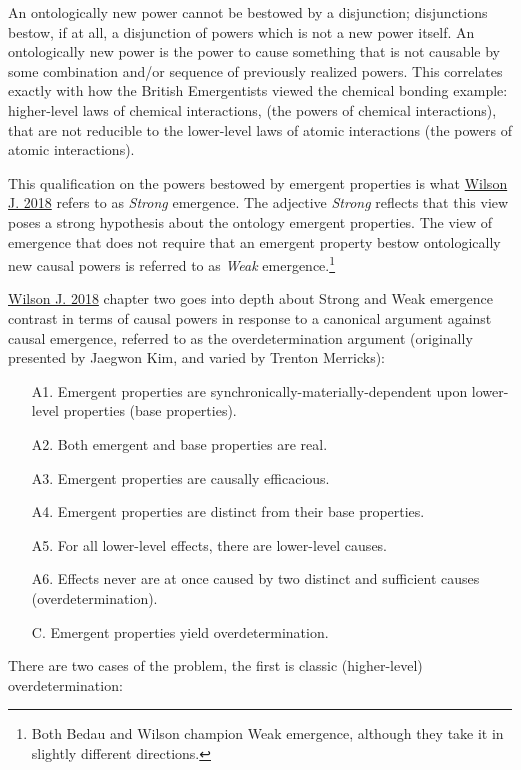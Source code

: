 \documentclass{article}
\newcommand{\ti}[1]{\textit{#1}}
\renewcommand{\cite}[1]{\hyperlink{#1}{#1}}
\begin{document}
An ontologically new power cannot be bestowed by a disjunction; disjunctions bestow, if at all, a disjunction of powers which is not a new power itself. An ontologically new power is the power to cause something that is not causable by some combination and/or sequence of previously realized powers. This correlates exactly with how the British Emergentists viewed the chemical bonding example: higher-level laws of chemical interactions, (the powers of chemical interactions), that are not reducible to the lower-level laws of atomic interactions (the powers of atomic interactions).

This qualification on the powers bestowed by emergent properties is what \cite{Wilson J. 2018} refers to as \ti{Strong} emergence. The adjective \ti{Strong} reflects that this view poses a strong hypothesis about the ontology emergent properties. The view of emergence that does not require that an emergent property bestow ontologically new causal powers is referred to as \ti{Weak} emergence.\footnote{Both Bedau and Wilson champion Weak emergence, although they take it in slightly different directions.}

\cite{Wilson J. 2018} chapter two goes into depth about Strong and Weak emergence contrast in terms of causal powers in response to a canonical argument against causal emergence, referred to as the overdetermination argument (originally presented by Jaegwon Kim, and varied by Trenton Merricks):

\begin{enumerate}
    \item[A1.] Emergent properties are synchronically-materially-dependent upon lower-level properties (base properties).
    \item[A2.] Both emergent and base properties are real.
    \item[A3.] Emergent properties are causally efficacious.
    \item[A4.] Emergent properties are distinct from their base properties.
    \item[A5.] For all lower-level effects, there are lower-level causes.
    \item[A6.] Effects never are at once caused by two distinct and sufficient causes (overdetermination).
    \item[C.] Emergent properties yield overdetermination.
\end{enumerate}

There are two cases of the problem, the first is classic (higher-level) overdetermination:
\end{document}
